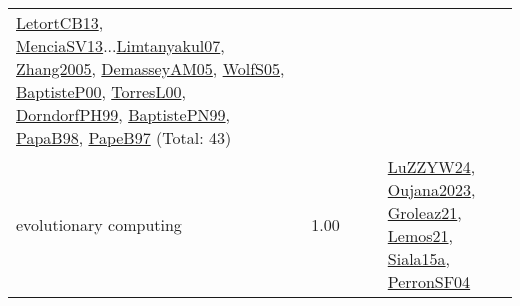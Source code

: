 {\begin{longtable}{p{3cm}r>{\raggedright\arraybackslash}p{6cm}>{\raggedright\arraybackslash}p{6cm}>{\raggedright\arraybackslash}p{8cm}}
\hyperref[detail:LetortCB13]{LetortCB13}, \hyperref[detail:MenciaSV13]{MenciaSV13}...\hyperref[detail:Limtanyakul07]{Limtanyakul07}, \hyperref[detail:Zhang2005]{Zhang2005}, \hyperref[detail:DemasseyAM05]{DemasseyAM05}, \hyperref[detail:WolfS05]{WolfS05}, \hyperref[detail:BaptisteP00]{BaptisteP00}, \hyperref[detail:TorresL00]{TorresL00}, \hyperref[detail:DorndorfPH99]{DorndorfPH99}, \hyperref[detail:BaptistePN99]{BaptistePN99}, \hyperref[detail:PapaB98]{PapaB98}, \hyperref[detail:PapeB97]{PapeB97} (Total: 43)\\
\index{evolutionary computing}\index{Algorithms!evolutionary computing}evolutionary computing &  1.00 &  &  & \hyperref[detail:LuZZYW24]{LuZZYW24}, \hyperref[detail:Oujana2023]{Oujana2023}, \hyperref[detail:Groleaz21]{Groleaz21}, \hyperref[detail:Lemos21]{Lemos21}, \hyperref[detail:Siala15a]{Siala15a}, \hyperref[detail:PerronSF04]{PerronSF04}\\

\end{longtable}}
